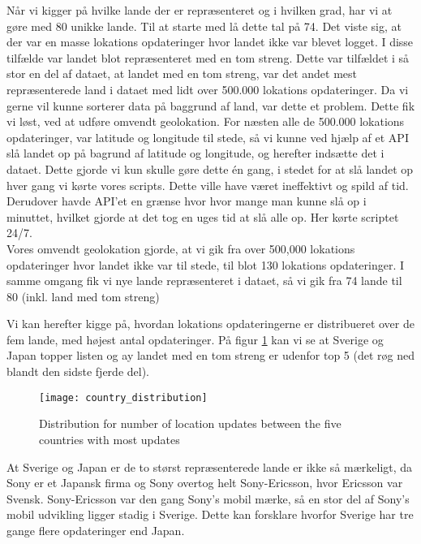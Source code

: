 Når vi kigger på hvilke lande der er repræsenteret og i hvilken grad, har vi at gøre med 80 unikke lande. Til at starte med lå dette tal på 74. Det viste sig, at der var en masse lokations opdateringer hvor landet ikke var blevet logget. I disse tilfælde var landet blot repræsenteret med en tom streng. Dette var tilfældet i så stor en del af dataet, at landet med en tom streng, var det andet mest repræsenterede land i dataet med lidt over 500.000 lokations opdateringer. 
Da vi gerne vil kunne sorterer data på baggrund af land, var dette et problem. Dette fik vi løst, ved at udføre omvendt geolokation. For næsten alle de 500.000 lokations opdateringer, var latitude og longitude til stede, så vi kunne ved hjælp af et API\cite{reversegeocode} slå landet op på bagrund af latitude og longitude, og herefter indsætte det i dataet. Dette gjorde vi kun skulle gøre dette én gang, i stedet for at slå landet op hver gang vi kørte vores scripts. Dette ville have været ineffektivt og spild af tid. Derudover havde API'et en grænse hvor hvor mange man kunne slå op i minuttet, hvilket gjorde at det tog en uges tid at slå alle op. Her kørte scriptet 24/7. \\ 
Vores omvendt geolokation gjorde, at vi gik fra over 500,000 lokations opdateringer hvor landet ikke var til stede, til blot 130 lokations opdateringer. I samme omgang fik vi nye lande repræsenteret i dataet, så vi gik fra 74 lande til 80 (inkl. land med tom streng)

Vi kan herefter kigge på, hvordan lokations opdateringerne er distribueret over de fem lande, med højest antal opdateringer. På figur \ref{fig:country_dist} kan vi se at Sverige og Japan topper listen og ay landet med en tom streng er udenfor top 5 (det røg ned blandt den sidste fjerde del).


\begin{figure}[H]
    \hspace*{-1.0cm}
    \centering
    \texttt{[image: country\_distribution]}
    \caption{Distribution for number of location updates between the five countries with most updates}
    \label{fig:country_dist}
\end{figure}


At Sverige og Japan er de to størst repræsenterede lande er ikke så mærkeligt, da Sony er et Japansk firma og Sony overtog helt Sony-Ericsson, hvor Ericsson var Svensk. Sony-Ericsson var den gang Sony's mobil mærke, så en stor del af Sony's mobil udvikling ligger stadig i Sverige. Dette kan forsklare hvorfor Sverige har tre gange flere opdateringer end Japan.  

